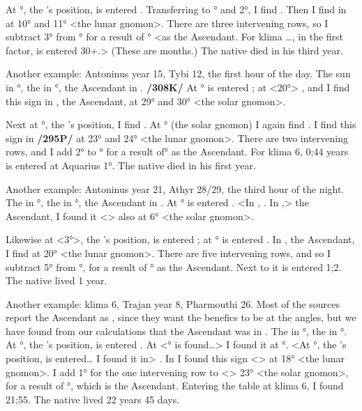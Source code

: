 At \Taurus\xspace 28°, the \Moon’s position, is entered \Aries. Transferring to \Aries\xspace 1° and 2°, I find \Leo. Then I find \Leo\xspace in \Capricorn\xspace at 10° and 11° <the lunar gnomon>. There are three intervening rows, so I subtract 3° from \Capricorn\xspace 1° for a result of \Sagittarius\xspace 28° <as the Ascendant. For klima …, in the first factor, is entered 30+.> (These are months.) The native died in his third year.

Another example: Antoninus year 15, Tybi 12, the first hour of the day. The sun in \Capricorn\xspace 20°, the \Moon\xspace in \Gemini\xspace 28°, the Ascendant in \Capricorn. \textbf{/308K/} At \Capricorn\xspace 20° is entered \Libra; at \Libra\xspace <20°> \Pisces, and I find this sign in \Capricorn, the Ascendant, at 29° and 30° <the solar gnomon>. 

Next at \Gemini\xspace 28°, the \Moon’s position, I find \Aquarius. At \Aquarius\xspace 29° (the solar gnomon) I again find \Aquarius. I find this sign in \Capricorn\xspace \textbf{/295P/} at 23° and 24° <the lunar gnomon>. There are two intervening rows, and I add 2° to \Capricorn\xspace 28° for a result of\Aquarius\xspace 1° as the Ascendant. For klima 6, 0;44 years is entered at Aquarius 1°. The native died in his first year.

Another example: Antoninus year 21, Athyr 28/29, the third hour of the night. The \Sun\xspace in \Sagittarius\xspace 6°, the \Moon\xspace in \Aquarius\xspace 3°, the Ascendant in \Cancer. At \Sagittarius\xspace 6° is entered \Cancer. <In \Cancer, \Aries. In \Cancer,> the Ascendant, I found it <\Aries> also at 6° <the solar gnomon>.

Likewise at \Aquarius\xspace <3°>, the \Moon’s position, is entered \Cancer; at \Cancer\xspace 3° is entered \Virgo. In \Cancer, the Ascendant, I find \Virgo\xspace at 20° <the lunar gnomon>. There are five intervening rows, and so I subtract 5° from \Cancer\xspace 6°, for a result of \Cancer\xspace 1° as the Ascendant. Next to it is entered 1;2. The native lived 1 year.

Another example: klima 6, Trajan year 8, Pharmouthi 26. Most of the sources report the Ascendant as \Cancer, since they want the benefics to be at the angles, but we have found from our calculations that the Ascendant was in \Gemini. The \Sun\xspace in \Taurus\xspace 3°, the \Moon\xspace in \Sagittarius\xspace 21°. At \Taurus\xspace 3°, the \Sun’s position, is entered \Aquarius. At <\Aquarius\xspace 3° is found…> I found it at \Gemini\xspace 23°. <At \Sagittarius\xspace 21°, the \Moon’s position, is entered… I found it in> \Scorpio. In \Gemini\xspace I found this sign <\Scorpio> at 18° <the lunar gnomon>. I add 1° for the one intervening row to <\Gemini> 23° <the solar gnomon>, for a result of \Gemini\xspace 24°, which is the Ascendant. Entering the table at klima 6, I found 21;55. The native lived 22 years 45 days.

